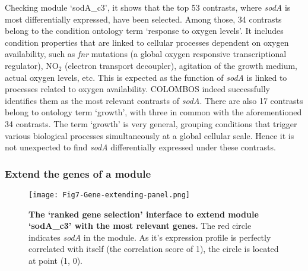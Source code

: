 \begin{small}
\end{small} %

Checking module `sodA\_c3', it shows that the top 53 contrasts, where \textit{sodA} is most differentially expressed, have been selected. Among those, 34 contrasts belong to the condition ontology term `response to oxygen levels'.  It includes condition properties that are linked to cellular processes dependent on oxygen availability, such as \textit{fnr} mutations (a global oxygen responsive transcriptional regulator), NO$_2$ (electron transport decoupler), agitation of the growth medium, actual oxygen levels, etc. This is expected as the function of \textit{sodA} is linked to processes related to oxygen availability. COLOMBOS indeed successfully identifies them as the most relevant contrasts of \textit{sodA}.  There are also 17 contrasts belong to ontology term `growth', with three in common with the aforementioned 34 contrasts. The term `growth' is very general, grouping conditions that trigger various biological processes simultaneously at a global cellular scale. Hence it is not unexpected to find \textit{sodA} differentially expressed under these contrasts.





\subsubsection{Extend the genes of a module}

\begin{figure}[b]
	\centering
  	\texttt{[image: Fig7-Gene-extending-panel.png]}
	\caption[COLOMBOS `ranked gene selection' interface]{
	\textbf{The `ranked gene selection' interface to extend module `sodA\_c3' 
	with the most relevant genes.} 
	The red circle indicates \textit{sodA} in the module. As it's expression 
	profile is perfectly correlated with itself (the correlation score of 1), 
	the circle is located at point (1, 0).}
	\label{fig:colombos-gene-extend}
\end{figure}

